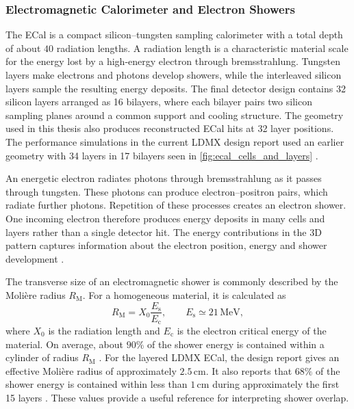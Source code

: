 \subsubsection{Electromagnetic Calorimeter and Electron Showers}


The ECal is a compact silicon--tungsten sampling calorimeter with a total
depth of about \(40\) radiation lengths. A radiation length is a
characteristic material scale for the energy lost by a high-energy electron
through bremsstrahlung. Tungsten layers make electrons and photons develop
showers, while the interleaved silicon layers sample the resulting energy
deposits. The final detector design contains 32 silicon layers arranged as
16 bilayers, where each bilayer pairs two silicon sampling planes around a
common support and cooling structure. The  geometry
used in this thesis also produces reconstructed ECal hits at 32 layer
positions. The performance simulations in the current LDMX design report
used an earlier geometry with 34 layers in 17 bilayers seen in \ref{fig:ecal_cells_and_layers}
\cite{ldmx2025-overview}.

An energetic electron radiates photons through \gls{bremsstrahlung} as it
passes through tungsten. These photons can produce electron--positron pairs,
which radiate further photons. Repetition of these processes creates an
\gls{electron shower}. One incoming electron therefore produces energy
deposits in many cells and layers rather than a single detector hit. The energy contributions in the 3D pattern captures information about the electron position,
energy and shower development \cite{groom2024-passage-particles}.

The transverse size of an electromagnetic shower is commonly described by
the Molière radius \(R_{\mathrm{M}}\). For a homogeneous material, it is
calculated as
\begin{equation}
    R_{\mathrm{M}} = X_0\frac{E_{\mathrm{s}}}{E_{\mathrm{c}}},
    \qquad E_{\mathrm{s}} \simeq 21\,\mathrm{MeV},
    \label{eq:moliere_radius}
\end{equation}
where \(X_0\) is the radiation length and \(E_{\mathrm{c}}\) is the electron
critical energy of the material. On average, about \(90\%\) of the shower
energy is contained within a cylinder of radius \(R_{\mathrm{M}}\)
\cite{groom2024-passage-particles}. For the layered LDMX ECal, the design
report gives an effective Molière radius of approximately \(2.5\,\mathrm{cm}\).
It also reports that \(68\%\) of the shower energy is contained within less
than \(1\,\mathrm{cm}\) during approximately the first 15 layers
\cite{ldmx2025-overview}. These values provide a useful reference for interpreting shower overlap.

